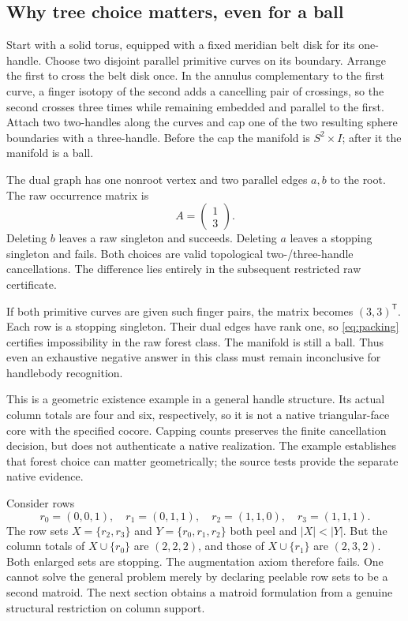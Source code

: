 \subsection{Why tree choice matters, even for a ball}
\begin{example}\label{ex:choice}
Start with a solid torus, equipped with a fixed meridian belt disk for its
one-handle.  Choose two disjoint parallel primitive curves on its boundary.
Arrange the first to cross the belt disk once.  In the annulus complementary
to the first curve, a finger isotopy of the second adds a cancelling pair
of crossings, so the second crosses three times while remaining embedded
and parallel to the first.  Attach two two-handles along the curves and cap
one of the two resulting sphere boundaries with a three-handle.  Before
the cap the manifold is $S^2\times I$; after it the manifold is a ball.

The dual graph has one nonroot vertex and two parallel edges $a,b$ to the
root.  The raw occurrence matrix is
\[
                  A=\begin{pmatrix}1\\3\end{pmatrix}.
\]
Deleting $b$ leaves a raw singleton and succeeds.  Deleting $a$ leaves a
stopping singleton and fails.  Both choices are valid topological
two-/three-handle cancellations.  The difference lies entirely in the
subsequent restricted raw certificate.

If both primitive curves are given such finger pairs, the matrix becomes
$(3,3)^{\mathsf T}$.  Each row is a stopping singleton.  Their dual edges
have rank one, so \eqref{eq:packing} certifies impossibility in the raw
forest class.  The manifold is still a ball.  Thus even an exhaustive
negative answer in this class must remain inconclusive for handlebody
recognition.
\end{example}

This is a geometric existence example in a general handle structure.
Its actual column totals are four and six, respectively, so it is not
a native triangular-face core with the specified cocore.  Capping counts
preserves the finite cancellation decision, but does not authenticate a
native realization.  The example establishes that forest choice can
matter geometrically; the source tests provide the separate native evidence.

\begin{example}\label{ex:nonmatroid}
Consider rows
\[
 r_0=(0,0,1),\quad r_1=(0,1,1),\quad
 r_2=(1,1,0),\quad r_3=(1,1,1).
\]
The row sets $X=\{r_2,r_3\}$ and $Y=\{r_0,r_1,r_2\}$ both peel and
$|X|<|Y|$.  But the column totals of $X\cup\{r_0\}$ are $(2,2,2)$,
and those of $X\cup\{r_1\}$ are $(2,3,2)$.  Both enlarged sets are
stopping.  The augmentation axiom therefore fails.  One cannot solve the
general problem merely by declaring peelable row sets to be a second
matroid.  The next section obtains a matroid formulation from a genuine
structural restriction on column support.
\end{example}
